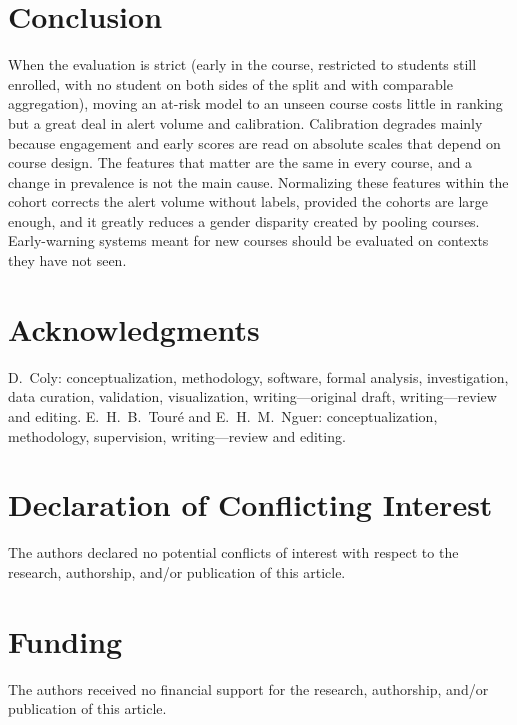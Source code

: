 \documentclass[fleqn,10pt]{JLA_article}
\newif\ifanonymous
\begin{document}
\section{Conclusion}
\label{sec:conclusion}
When the evaluation is strict (early in the course, restricted to students still enrolled, with no student on both sides of the split and with comparable aggregation), moving an at-risk model to an unseen course costs little in ranking but a great deal in alert volume and calibration. Calibration degrades mainly because engagement and early scores are read on absolute scales that depend on course design. The features that matter are the same in every course, and a change in prevalence is not the main cause. Normalizing these features within the cohort corrects the alert volume without labels, provided the cohorts are large enough, and it greatly reduces a gender disparity created by pooling courses. Early-warning systems meant for new courses should be evaluated on contexts they have not seen.

\ifanonymous\else
\section*{Acknowledgments}
D.~Coly: conceptualization, methodology, software, formal analysis, investigation, data curation, validation, visualization, writing---original draft, writing---review and editing. E.~H.~B.~Tour\'e and E.~H.~M.~Nguer: conceptualization, methodology, supervision, writing---review and editing.
\fi

\section*{Declaration of Conflicting Interest}
The authors declared no potential conflicts of interest with respect to the research, authorship, and/or publication of this article.

\section*{Funding}
The authors received no financial support for the research, authorship, and/or publication of this article.

\printbibliography
\end{document}
